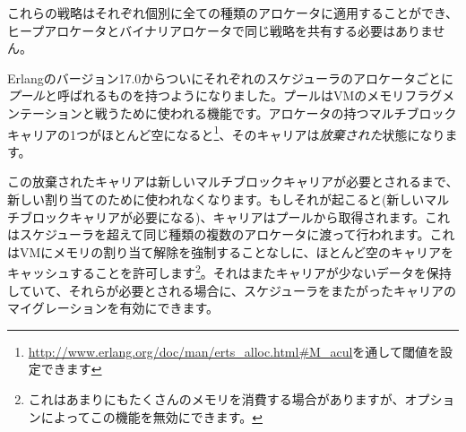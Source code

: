 これらの戦略はそれぞれ個別に全ての種類のアロケータに適用することができ、ヒープアロケータとバイナリアロケータで同じ戦略を共有する必要はありません。

Erlangのバージョン17.0からついにそれぞれのスケジューラのアロケータごとに\emph{プール}と呼ばれるものを持つようになりました。プールはVMのメモリフラグメンテーションと戦うために使われる機能です。アロケータの持つマルチブロックキャリアの1つがほとんど空になると\footnote{\href{http://www.erlang.org/doc/man/erts\_alloc.html\#M\_acul}{http://www.erlang.org/doc/man/erts\_alloc.html\#M\_acul}を通して閾値を設定できます}、そのキャリアは\emph{放棄された}状態になります。

この放棄されたキャリアは新しいマルチブロックキャリアが必要とされるまで、新しい割り当てのために使われなくなります。もしそれが起こると(新しいマルチブロックキャリアが必要になる)、キャリアはプールから取得されます。これはスケジューラを超えて同じ種類の複数のアロケータに渡って行われます。これはVMにメモリの割り当て解除を強制することなしに、ほとんど空のキャリアをキャッシュすることを許可します\footnote{これはあまりにもたくさんのメモリを消費する場合がありますが、オプションによってこの機能を無効にできます。}。それはまたキャリアが少ないデータを保持していて、それらが必要とされる場合に、スケジューラをまたがったキャリアのマイグレーションを有効にできます。

